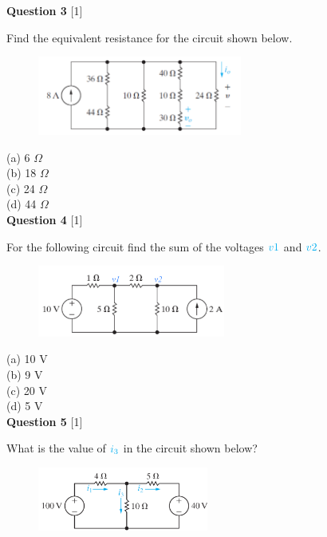 \documentclass[12pt]{article}
\begin{document}
\noindent
{\bf Question 3} [1]

Find the equivalent resistance for the circuit shown below.
\begin{figure}[h!]
  \centering 
  \includegraphics[clip,width=0.6\textwidth]{Fig-E3-7.png}
\end{figure}

\noindent
(a) 6 $\Omega$ \\%
(b) 18 $\Omega$\\
(c) 24 $\Omega$\\
(d) 44 $\Omega$\\

\newpage
\noindent
{\bf Question 4} [1]

For the following circuit find the sum of the voltages ${\color{cyan} v1}$ and ${\color{cyan} v2}$.
\begin{figure}[h!]
  \centering 
  \includegraphics[clip,width=0.55\textwidth]{Fig4-5.png}
\end{figure}

\noindent
(a) 10 V\\
(b) 9 V\\
(c) 20 V \\%
(d) 5 V\\

\noindent
{\bf Question 5} [1]

What is the value of ${\color{cyan} i_{3}}$ in the circuit shown below?
\begin{figure}[h!]
\centering 
\includegraphics[clip,width=0.5\textwidth]{Fig4-19.png}
\end{figure}
\end{document}
